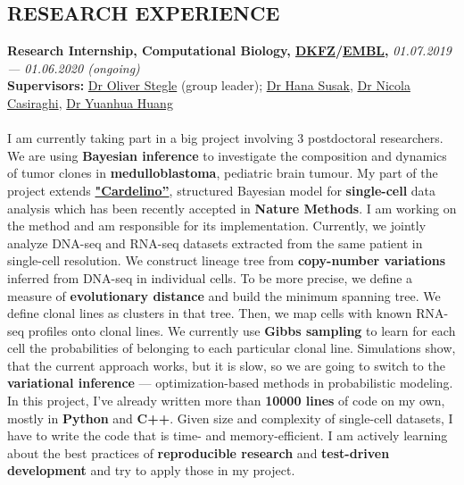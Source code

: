 \documentclass[11pt]{res}
\newcommand{\vmarginsmall}{\vspace{0.1cm}}
\begin{document}
\begin{resume}
\section{RESEARCH EXPERIENCE}
\vmarginsmall
\par 
\textbf{Research Internship, Computational Biology, \href{https://www.dkfz.de/en/index.html}{DKFZ}/\href{https://www.embl.de}{EMBL},}\hfill{} \textit{01.07.2019 — 01.06.2020 (ongoing)}\\
\textbf{Supervisors:} \href{https://scholar.google.com/citations?user=ClSXZ4IAAAAJ&hl=en}{Dr Oliver Stegle} (group leader); \href{https://www.researchgate.net/profile/Hana_Susak}{Dr Hana Susak}, \href{https://scholar.google.com/citations?user=Uo7F714AAAAJ&hl=en&oi=ao}{Dr Nicola Casiraghi}, \href{https://scholar.google.com/citations?user=LUUIw_EAAAAJ&hl=en&oi=ao}{Dr Yuanhua Huang}\\\\
I am currently taking part in a big project involving 3 postdoctoral researchers. We are using \textbf{Bayesian inference} to investigate the composition and dynamics of tumor clones in \textbf{medulloblastoma}, pediatric brain tumour. My part of the project extends \href{https://www.biorxiv.org/content/10.1101/413047v1}{\textbf{"Cardelino”}}, structured Bayesian model for \textbf{single-cell} data analysis which has been recently accepted in \textbf{Nature Methods}. I am working on the method and am responsible for its implementation. Currently, we jointly analyze DNA-seq and RNA-seq datasets extracted from the same patient in single-cell resolution. We construct lineage tree from \textbf{copy-number variations} inferred from DNA-seq in individual cells. To be more precise, we define a measure of \textbf{evolutionary distance} and build the minimum spanning tree. We define clonal lines as clusters in that tree. Then, we map cells with known RNA-seq profiles onto clonal lines. We currently use \textbf{Gibbs sampling} to learn for each cell the probabilities of belonging to each particular clonal line. Simulations show, that the current approach works, but it is slow, so we are going to switch to the \textbf{variational inference} — optimization-based methods in probabilistic modeling. In this project, I've already written more than \textbf{10000 lines} of code on my own, mostly in \textbf{Python} and \textbf{C++}. Given size and complexity of single-cell datasets, I have to write the code that is time- and memory-efficient. I am actively learning about the best practices of \textbf{reproducible research} and \textbf{test-driven development} and try to apply those in my project. 

\end{resume}
\end{document}
